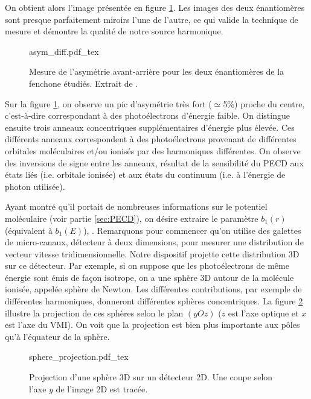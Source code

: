 On obtient alors l'image présentée en figure \ref{fig:asym_diff}. Les images des deux énantiomères sont presque parfaitement miroirs l'une de l'autre, ce qui valide la technique de mesure et démontre la qualité de notre source harmonique. 

\begin{figure}[!ht]
\centering
\def\svgwidth{0.8\columnwidth}
{asym_diff.pdf_tex}
\caption{Mesure de l'asymétrie avant-arrière pour les deux énantiomères de la fenchone étudiés. Extrait de .}
\label{fig:asym_diff}
\end{figure}

Sur la figure \ref{fig:asym_diff}, on observe un pic d'asymétrie très fort ($\simeq$5\%) proche du centre, c'est-à-dire correspondant à des photoélectrons d'énergie faible. On distingue ensuite trois anneaux concentriques supplémentaires d'énergie plus élevée. Ces différents anneaux correspondent à des photoélectrons provenant de différentes orbitales moléculaires et/ou ionisés par des harmoniques différentes. On observe des inversions de signe entre les anneaux, résultat de la sensibilité du PECD aux états liés (i.e. orbitale ionisée) et aux états du continuum (i.e. à l'énergie de photon utilisée). 

Ayant montré qu'il portait de nombreuses informations sur le potentiel moléculaire (voir partie \ref{sec:PECD}), on désire extraire le paramètre $b_1(r)$ (équivalent à $b_1(E)$), . Remarquons pour commencer qu'on utilise des galettes de micro-canaux, détecteur à deux dimensions, pour mesurer une distribution de vecteur vitesse tridimensionnelle. Notre dispositif projette cette distribution 3D sur ce détecteur. Par exemple, si on suppose que les photoélectrons de même énergie sont émis de façon isotrope, on a une sphère 3D autour de la molécule ionisée, appelée sphère de Newton. Les différentes contributions, par exemple de différentes harmoniques, donneront différentes sphères concentriques. La figure \ref{fig:sphere_projection} illustre la projection de ces sphères selon le plan $(yOz)$ ($z$ est l'axe optique et $x$ est l'axe du VMI). On voit que la projection est bien plus importante aux pôles qu'à l'équateur de la sphère. 

\begin{figure}[!ht]
\centering
\def\svgwidth{0.6\columnwidth}
{sphere_projection.pdf_tex}
\caption{Projection d'une sphère 3D sur un détecteur 2D. Une coupe selon l'axe $y$ de l'image 2D est tracée.}
\label{fig:sphere_projection}
\end{figure}

